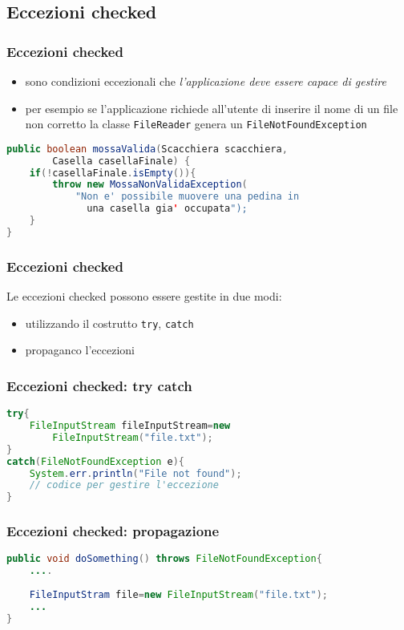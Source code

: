 \documentclass{beamer}
\begin{document}
\subsection{Eccezioni checked}
\begin{frame}[fragile]
\frametitle{Eccezioni checked}
\begin{itemize}
\item sono condizioni eccezionali che \emph{l'applicazione deve essere capace di gestire} 
\item  per esempio se l'applicazione richiede all'utente di inserire il nome di un file non corretto la classe \texttt{FileReader} genera un \texttt{FileNotFoundException}
\end{itemize}
\begin{framed}
\begin{lstlisting}[language=Java]
public boolean mossaValida(Scacchiera scacchiera, 
        Casella casellaFinale) {
    if(!casellaFinale.isEmpty()){
        throw new MossaNonValidaException(
            "Non e' possibile muovere una pedina in 
              una casella gia' occupata");
    }
}
\end{lstlisting}
\end{framed}
\end{frame}


\begin{frame}[fragile]
\frametitle{Eccezioni checked}
Le eccezioni checked possono essere gestite in due modi:
\begin{itemize}
\item utilizzando il costrutto \texttt{try}, \texttt{catch}
\item propaganco l'eccezioni
\end{itemize}
\end{frame}

\begin{frame}[fragile]
\frametitle{Eccezioni checked: try catch}
\begin{lstlisting}[language=Java]
try{
    FileInputStream fileInputStream=new 
        FileInputStream("file.txt");        
}
catch(FileNotFoundException e){
    System.err.println("File not found");
    // codice per gestire l'eccezione
}
\end{lstlisting}
\end{frame}


\begin{frame}[fragile]
\frametitle{Eccezioni checked: propagazione}
\begin{lstlisting}[language=Java]
public void doSomething() throws FileNotFoundException{
    ....
    
    FileInputStram file=new FileInputStream("file.txt");
    ...
}
\end{lstlisting}
\end{frame}
\end{document}
